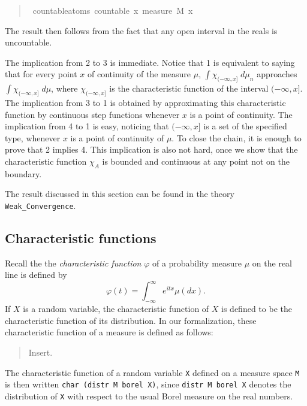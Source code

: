 \documentclass{svjour3}
\newcommand{\todo}[1]{{\color{red}#1}}
\newcommand{\ph}{\varphi}
\begin{document}
\begin{quote}
\begin{isabellebody}
\isamarkupfalse%
\ countable{\isacharunderscore}atoms{\isacharcolon}\ {\isachardoublequoteopen}countable\ {\isacharbraceleft}x{\isachardot}\ measure\ M\ {\isacharbraceleft}x{\isacharbraceright}\ {\isachargreater}\ {}{\isacharbraceright}{\isachardoublequoteclose}
\end{isabellebody}
\end{quote}
The result then follows from the fact that any open interval in the reals is uncountable. 

The implication from 2 to 3 is immediate. Notice that 1 is equivalent to saying that for every point $x$ of continuity of the measure $\mu$, $\int \chi_{(-\infty,x]} \; d\mu_n$ approaches $\int \chi_{(-\infty,x]} \; d\mu$, where $\chi_{(-\infty,x]}$ is the characteristic function of the interval $(-\infty,x]$. The implication from 3 to 1 is obtained by approximating this characteristic function by continuous step functions whenever $x$ is a point of continuity. The implication from 4 to 1 is easy, noticing that $(-\infty,x]$ is a set of the specified type, whenever $x$ is a point of continuity of $\mu$. To close the chain, it is enough to prove that 2 implies 4. This implication is also not hard, once we show that the characteristic function $\chi_A$ is bounded and continuous at any point not on the boundary.

The result discussed in this section can be found in the theory \verb=Weak_Convergence=.

\subsection{Characteristic functions}
\label{subsection:characteristic}

Recall the the \emph{characteristic function} $\ph$ of a probability measure $\mu$ on the real line is defined by
\[
\ph(t) = \int_{-\infty}^{\infty} e^{itx} \mu(dx).
\]
If $X$ is a random variable, the characteristic function of $X$ is defined to be the characteristic function of its distribution.
In our formalization, these characteristic function of a measure is defined as follows:
\begin{quote}
 \todo{Insert.}
\end{quote}
The characteristic function of a random variable \texttt{X} defined on a measure space \texttt{M} is then written \texttt{char (distr M borel X)}, since \texttt{distr M borel X} denotes the distribution of \texttt{X} with respect to the usual Borel measure on the real numbers.
\end{document}
